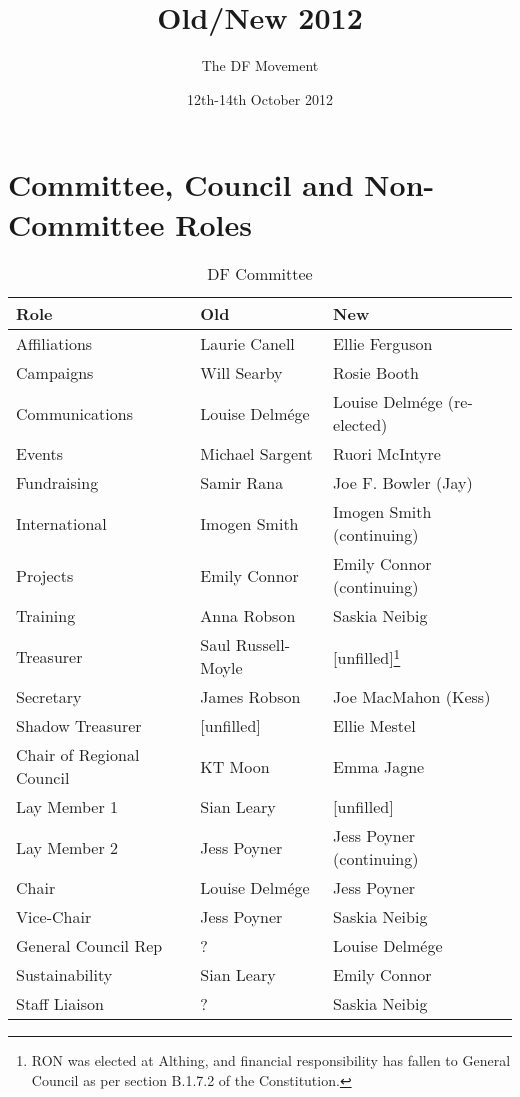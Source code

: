 \documentclass[a4paper, 12pt]{article}
\title{Old/New 2012}
\author{The DF Movement}
\date{12th-14th October 2012}
\begin{document}
\maketitle
\tableofcontents

\clearpage

\section{Committee, Council and Non-Committee Roles}
\begin{savenotes}
\begin{table}[H]
\centering

\begin{tabular}{ l || l | l }
\textbf{Role}				& \textbf{Old}			& \textbf{New} \\ \hline
Affiliations				& Laurie Canell		& Ellie Ferguson \\
Campaigns				& Will Searby			& Rosie Booth \\
Communications			& Louise Delmége		& Louise Delmége (re-elected) \\
Events					& Michael Sargent		& Ruori McIntyre \\
Fundraising				& Samir Rana			& Joe F. Bowler (Jay) \\
International				& Imogen Smith		& Imogen Smith (continuing) \\
Projects					& Emily Connor		& Emily Connor (continuing) \\
Training					& Anna Robson		& Saskia Neibig \\
Treasurer					& Saul Russell-Moyle	& [unfilled]\footnote{RON was elected at Althing, and financial responsibility has fallen to General Council as per section B.1.7.2 of the Constitution.} \\
Secretary					& James Robson		& Joe MacMahon (Kess) \\
Shadow Treasurer			& [unfilled]			& Ellie Mestel \\
Chair of Regional Council	& KT Moon				& Emma Jagne \\
Lay Member 1				& Sian Leary			& [unfilled] \\
Lay Member 2				& Jess Poyner			& Jess Poyner (continuing) \\
Chair					& Louise Delmége		& Jess Poyner \\
Vice-Chair				& Jess Poyner			& Saskia Neibig \\
General Council Rep			& ?					& Louise Delmége \\
Sustainability				& Sian Leary			& Emily Connor \\
Staff Liaison				& ?					& Saskia Neibig \\
\end{tabular}
\caption{DF Committee}
\label{tab:ctte}
\end{table}
\end{savenotes}
\end{document}
